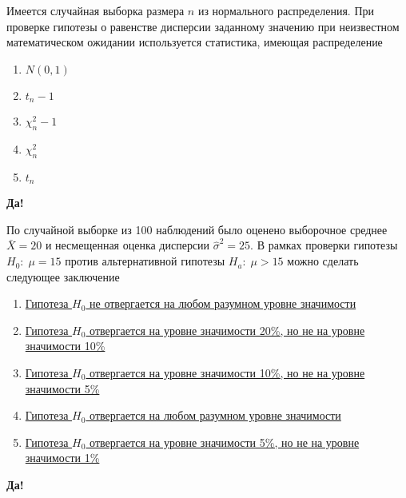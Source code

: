 \documentclass[t]{beamer}
\begin{document}
 \begin{frame} \label{11-Yes} 
\begin{block}{11} 

Имеется случайная выборка размера $n$ из нормального распределения. При проверке гипотезы о равенстве дисперсии заданному значению при неизвестном математическом ожидании используется статистика, имеющая распределение
 


 \end{block} 
\begin{enumerate} 
\item[] \hyperlink{11-No}{\beamergotobutton{} $N(0,1)$}
\item[] \hyperlink{11-No}{\beamergotobutton{} $t_n-1$}
\item[] \hyperlink{11-Yes}{\beamergotobutton{} $\chi^2_n-1$}
\item[] \hyperlink{11-No}{\beamergotobutton{} $\chi^2_n$}
\item[] \hyperlink{11-No}{\beamergotobutton{} $t_n$}
\end{enumerate} 

 \textbf{Да!} 
 \hyperlink{12}{}\end{frame} 


 \begin{frame} \label{12-Yes} 
\begin{block}{12} 

По случайной выборке из 100 наблюдений было оценено выборочное среднее $\bar{X}=20$  и несмещенная оценка дисперсии  $\hat{\sigma}^2=25$. В рамках проверки гипотезы $H_0: \; \mu=15$  против альтернативной гипотезы $H_a: \; \mu>15$  можно сделать следующее заключение
 


 \end{block} 
\begin{enumerate} 
\item[] \hyperlink{12-No}{\beamergotobutton{} Гипотеза $H_0$  не отвергается на любом разумном уровне значимости}
\item[] \hyperlink{12-No}{\beamergotobutton{} Гипотеза  $H_0$ отвергается на уровне значимости 20\%, но не  на уровне значимости 10\%}
\item[] \hyperlink{12-No}{\beamergotobutton{} Гипотеза  $H_0$ отвергается на уровне значимости 10\%, но не на уровне значимости 5\%}
\item[] \hyperlink{12-Yes}{\beamergotobutton{} Гипотеза $H_0$  отвергается на любом разумном уровне значимости}
\item[] \hyperlink{12-No}{\beamergotobutton{} Гипотеза $H_0$  отвергается на уровне значимости 5\%, но не  на уровне значимости 1\%}
\end{enumerate} 

 \textbf{Да!} 
 \hyperlink{13}{}\end{frame} 
\end{document}
